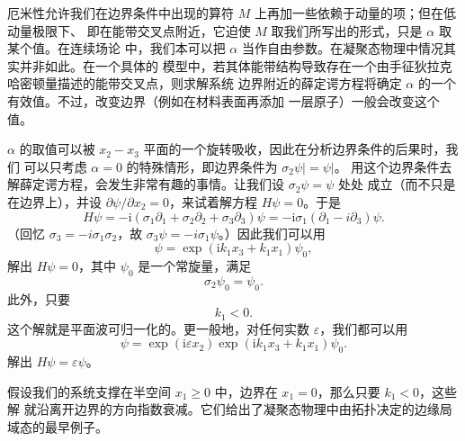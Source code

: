 \documentclass[11pt,a4paper]{article}
\numberwithin{equation}{section}
\def\veps{\varepsilon}
\def\i{\mathrm i}
\def\be{\begin{equation}}
\def\ee{\end{equation}}
\begin{document}
厄米性允许我们在边界条件中出现的算符 $M$ 上再加一些依赖于动量的项；但在低动量极限下、
即在能带交叉点附近，它迫使 $M$ 取我们所写出的形式，只是 $\alpha$ 取某个值。在连续场论
中，我们本可以把 $\alpha$ 当作自由参数。在凝聚态物理中情况其实并非如此。在一个具体的
模型中，若其体能带结构导致存在一个由手征狄拉克哈密顿量描述的能带交叉点，则求解系统
边界附近的薛定谔方程将确定 $\alpha$ 的一个有效值。不过，改变边界（例如在材料表面再添加
一层原子）一般会改变这个值。

 $\alpha$ 的取值可以被 $x_2-x_3$ 平面的一个旋转吸收，因此在分析边界条件的后果时，我们
可以只考虑 $\alpha=0$ 的特殊情形，即边界条件为 $\sigma_2\psi\vert=\psi\vert$。
用这个边界条件去解薛定谔方程，会发生非常有趣的事情。让我们设 $\sigma_2\psi=\psi$ 处处
成立（而不只是在边界上），并设 $\partial\psi/\partial x_2=0$，来试着解方程 $H\psi=0$。于是
\be\label{wolt}H\psi=-\i\left(\sigma_1\partial_1+\sigma_2\partial_2+\sigma_3\partial_3\right)\psi=-\i\sigma_1(\partial_1-i\partial_3)\psi.\ee 
（回忆 $\sigma_3=-i\sigma_1\sigma_2$，故 $\sigma_3\psi=-i\sigma_1\psi$。）因此我们可以用
\be\label{polk}\psi=\exp(\i k_1 x_3+k_1x_1)\psi_0,\ee
解出 $H\psi=0$，其中 $\psi_0$ 是一个常旋量，满足
\be\label{folt}\sigma_2\psi_0=\psi_0.\ee
此外，只要
\be\label{formix}k_1<0.\ee
这个解就是平面波可归一化的。更一般地，对任何实数 $\veps$，我们都可以用
\be\label{molt}\psi=\exp(\i\veps x_2)\exp(\i k_1 x_3+k_1x_1)\psi_0.\ee
解出 $H\psi=\veps\psi$。

假设我们的系统支撑在半空间 $x_1\geq 0$ 中，边界在 $x_1=0$，那么只要 $k_1< 0$，这些解
就沿离开边界的方向指数衰减。它们给出了凝聚态物理中由拓扑决定的边缘局域态的最早例子。
\end{document}
